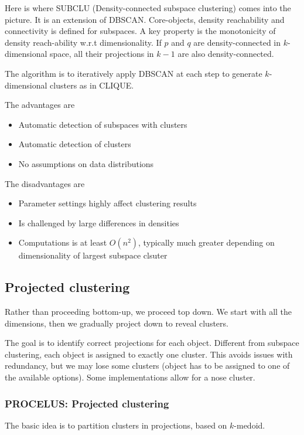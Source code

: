 Here is where SUBCLU (Density-connected subspace clustering) comes into the picture. It is an extension of DBSCAN. Core-objects, density reachability and connectivity is defined for subspaces. A key property is the monotonicity of density reach-ability w.r.t dimensionality. If $p$ and $q$ are density-connected in $k$-dimensional space, all their projections in $k-1$ are also density-connected.

The algorithm is to iteratively apply DBSCAN at each step to generate $k$-dimensional clusters as in CLIQUE.

The advantages are
\begin{itemize}
    \item Automatic detection of subspaces with clusters
    \item Automatic detection of clusters
    \item No assumptions on data distributions
\end{itemize}
The disadvantages are
\begin{itemize}
    \item Parameter settings highly affect clustering results
    \item Is challenged by large differences in densities
    \item Computations is at least $O(n^2)$, typically much greater depending on dimensionality of largest subspace clsuter
\end{itemize}

\subsection{Projected clustering}
    Rather than proceeding bottom-up, we proceed top down. We start with all the dimensions, then we gradually project down to reveal clusters. 

    The goal is to identify correct projections for each object. Different from subspace clustering, each object is assigned to exactly one cluster. This avoids issues with redundancy, but we may lose some clusters (object has to be assigned to one of the available options). Some implementations allow for a nose cluster.
    
\subsubsection{PROCELUS: Projected clustering}
    The basic idea is to partition clusters in projections, based on $k$-medoid. 
    
